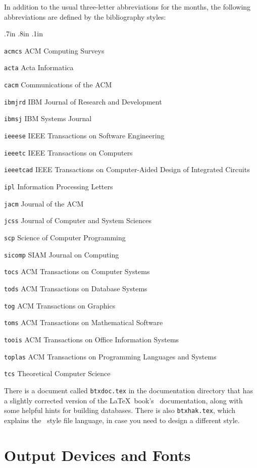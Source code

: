 In addition to the usual three-letter abbreviations for the months, the
following abbreviations are defined by the bibliography styles:
\begin{list}{}{\leftmargin 0pt
	.7in \leftmargin .8in \itemsep .1in
	\def\makelabel#1{#1\hfill}%
}\it
\item[\tt acmcs] ACM Computing Surveys
\item[\tt acta] Acta Informatica
\item[\tt cacm] Communications of the ACM
\item[\tt ibmjrd] IBM Journal of Research and Development
\item[\tt ibmsj] IBM Systems Journal
\item[\tt ieeese] IEEE Transactions on Software Engineering
\item[\tt ieeetc] IEEE Transactions on Computers
\item[\tt ieeetcad]
 IEEE Transactions on Computer-Aided Design of Integrated Circuits
\item[\tt ipl] Information Processing Letters
\item[\tt jacm] Journal of the ACM
\item[\tt jcss] Journal of Computer and System Sciences
\item[\tt scp] Science of Computer Programming
\item[\tt sicomp] SIAM Journal on Computing
\item[\tt tocs] ACM Transactions on Computer Systems
\item[\tt tods] ACM Transactions on Database Systems
\item[\tt tog] ACM Transactions on Graphics
\item[\tt toms] ACM Transactions on Mathematical Software
\item[\tt toois] ACM Transactions on Office Information Systems
\item[\tt toplas] ACM Transactions on Programming Languages and Systems
\item[\tt tcs] Theoretical Computer Science
\end{list}

There is a document called \verb|btxdoc.tex| in the documentation
directory that has a slightly corrected version of the \LaTeX\ book's
\BibTeX\ documentation, along with some helpful hints for building
databases.
There is also \verb|btxhak.tex|, which explains the \BibTeX\ style file
language, in case you need to design a different style.

\section{Output Devices and Fonts}

